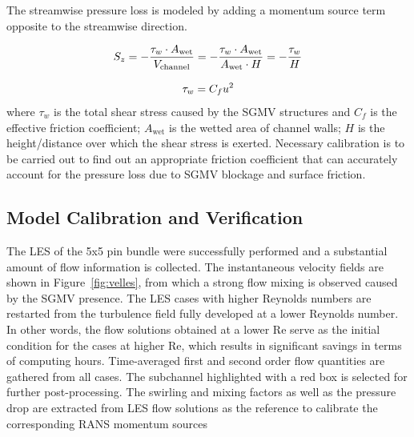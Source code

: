 The streamwise pressure loss is modeled by adding a momentum source term opposite to the streamwise direction.

\begin{equation}
  S_z = -\frac{\tau_w \cdot A_\text{wet}}{V_\text{channel}}=-\frac{\tau_w \cdot A_\text{wet}}{A_\text{wet} \cdot H}=-\frac{\tau_w}{H}\\
\end{equation}

\begin{equation}
  \tau_w = C_fu^2\\
\end{equation}
where $\tau_w$ is the total shear stress caused by the SGMV structures and
$C_f$ is the effective friction coefficient;
$A_\text{wet}$ is the wetted area of channel walls;
$H$ is the height/distance over which the shear stress is exerted.
Necessary calibration is to be carried out to find out an appropriate friction coefficient that can accurately account for the pressure loss due to SGMV blockage and surface friction.


\subsection{Model Calibration and Verification}
\label{sec:msm3}

The LES of the 5x5 pin bundle were successfully performed and a substantial amount of flow information is collected.
The instantaneous velocity fields are shown in Figure~\ref{fig:velles}, from which a strong flow mixing is observed caused by the SGMV presence.
The LES cases with higher Reynolds numbers are restarted from the turbulence field fully developed at a lower Reynolds number.
In other words, the flow solutions obtained at a lower Re serve as the initial condition for the cases at higher Re, which results in significant savings in terms of computing hours.
Time-averaged first and second order flow quantities are gathered from all cases.
The subchannel highlighted with a red box is selected for further post-processing. The swirling and mixing factors as well as the pressure drop are extracted from LES flow solutions as the reference to calibrate the corresponding RANS momentum sources

